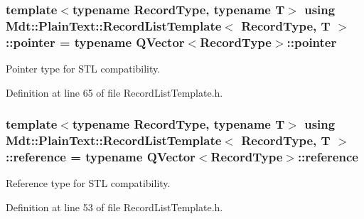 \subsubsection[{\texorpdfstring{pointer}{pointer}}]{\setlength{\rightskip}{0pt plus 5cm}template$<$typename Record\+Type, typename T$>$ using {\bf Mdt\+::\+Plain\+Text\+::\+Record\+List\+Template}$<$ Record\+Type, T $>$\+::{\bf pointer} =  typename Q\+Vector$<$Record\+Type$>$\+::{\bf pointer}}\hypertarget{class_mdt_1_1_plain_text_1_1_record_list_template_a95aa000e23da3c55a41e4d9e81ffedbb}{}\label{class_mdt_1_1_plain_text_1_1_record_list_template_a95aa000e23da3c55a41e4d9e81ffedbb}


Pointer type for S\+TL compatibility. 



Definition at line 65 of file Record\+List\+Template.\+h.

\subsubsection[{\texorpdfstring{reference}{reference}}]{\setlength{\rightskip}{0pt plus 5cm}template$<$typename Record\+Type, typename T$>$ using {\bf Mdt\+::\+Plain\+Text\+::\+Record\+List\+Template}$<$ Record\+Type, T $>$\+::{\bf reference} =  typename Q\+Vector$<$Record\+Type$>$\+::{\bf reference}}\hypertarget{class_mdt_1_1_plain_text_1_1_record_list_template_a9f3af13db580a27488883003f589489f}{}\label{class_mdt_1_1_plain_text_1_1_record_list_template_a9f3af13db580a27488883003f589489f}


Reference type for S\+TL compatibility. 



Definition at line 53 of file Record\+List\+Template.\+h.


